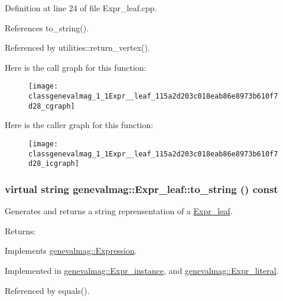 Definition at line 24 of file Expr\_\-leaf.cpp.

References to\_\-string().

Referenced by utilities::return\_\-vertex().

Here is the call graph for this function:\nopagebreak
\begin{figure}[H]
\begin{center}
\leavevmode
\texttt{[image: classgenevalmag\_1\_1Expr\_\_leaf\_115a2d203c018eab86e8973b610f7d28\_cgraph]}
\end{center}
\end{figure}


Here is the caller graph for this function:\nopagebreak
\begin{figure}[H]
\begin{center}
\leavevmode
\texttt{[image: classgenevalmag\_1\_1Expr\_\_leaf\_115a2d203c018eab86e8973b610f7d28\_icgraph]}
\end{center}
\end{figure}
\hypertarget{classgenevalmag_1_1Expr__leaf_96854f59a155b173b6e79007d87bdad5}{
\subsubsection[{to\_\-string}]{\setlength{\rightskip}{0pt plus 5cm}virtual string genevalmag::Expr\_\-leaf::to\_\-string () const}}
\label{classgenevalmag_1_1Expr__leaf_96854f59a155b173b6e79007d87bdad5}


Generates and returns a string reprensentation of a \hyperlink{classgenevalmag_1_1Expr__leaf}{Expr\_\-leaf}. \begin{Desc}
\item[Returns:]\end{Desc}


Implements \hyperlink{classgenevalmag_1_1Expression_8685f44429501da942b1fe76880af6fe}{genevalmag::Expression}.

Implemented in \hyperlink{classgenevalmag_1_1Expr__instance_2186bb2f69173f709cfb75435b32da94}{genevalmag::Expr\_\-instance}, and \hyperlink{classgenevalmag_1_1Expr__literal_2e023f432f0a46b75f65cb0e36ac6583}{genevalmag::Expr\_\-literal}.

Referenced by equals().

